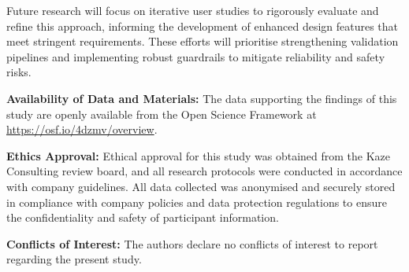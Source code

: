 \documentclass{article}
\begin{document}
Future research will focus on iterative user studies to rigorously evaluate and refine this approach, informing the development of enhanced design features that meet stringent requirements. These efforts will prioritise strengthening validation pipelines and implementing robust guardrails \cite{jai.2025.069841} to mitigate reliability and safety risks.

\textbf{Availability of Data and Materials:} The data supporting the findings of this study are openly available from the Open Science Framework at \url{https://osf.io/4dzmv/overview}.

\textbf{Ethics Approval:} Ethical approval for this study was obtained from the Kaze Consulting review board, and all research protocols were conducted in accordance with company guidelines. All data collected was anonymised and securely stored in compliance with company policies and data protection regulations to ensure the confidentiality and safety of participant information.

\textbf{Conflicts of Interest:} The authors declare no conflicts of interest to report regarding the present study.


  

\end{document}
